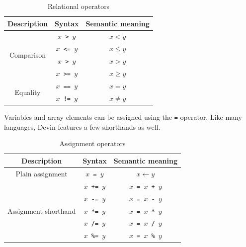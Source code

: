 \documentclass[UdineBachThesis,american,11pt]{PhdThesis}
\begin{document}
  \begin{table}[H]
    \centering

    \begin{tabular}{|c|c|c|}
      \hline

      Description &
      Syntax &
      Semantic meaning \\
      \hline

      \multirow{4}{*}{Comparison} &
      \texttt{$x$ > $y$} &
      $x < y$ \\

      &
      \texttt{$x$ <= $y$} &
      $x \leq y$ \\

      &
      \texttt{$x$ > $y$} &
      $x > y$ \\

      &
      \texttt{$x$ >= $y$} &
      $x \geq y$ \\

      \multirow{2}{*}{Equality} &
      \texttt{$x$ == $y$} &
      $x = y$ \\

      &
      \texttt{$x$ != $y$} &
      $x \neq y$ \\
      \hline
    \end{tabular}

    \caption{Relational operators}
  \end{table}

  Variables and array elements can be assigned using the \texttt{=} operator.
  Like many languages, Devin features a few shorthands as well.

  \begin{table}[H]
    \centering

    \begin{tabular}{|c|c|c|}
      \hline

      Description &
      Syntax &
      Semantic meaning \\
      \hline

      Plain assignment &
      \texttt{$x$ = $y$} &
      $x \leftarrow y$ \\

      \multirow{5}{*}{Assignment shorthand} &
      \texttt{$x$ += $y$} &
      \texttt{$x$ = $x$ + $y$} \\

      &
      \texttt{$x$ -= $y$} &
      \texttt{$x$ = $x$ - $y$} \\

      &
      \texttt{$x$ *= $y$} &
      \texttt{$x$ = $x$ * $y$} \\

      &
      \texttt{$x$ /= $y$} &
      \texttt{$x$ = $x$ / $y$} \\

      &
      \texttt{$x$ \%= $y$} &
      \texttt{$x$ = $x$ \% $y$} \\
      \hline
    \end{tabular}

    \caption{Assignment operators}
    \label{table:assignment-operators}
  \end{table}
\end{document}
